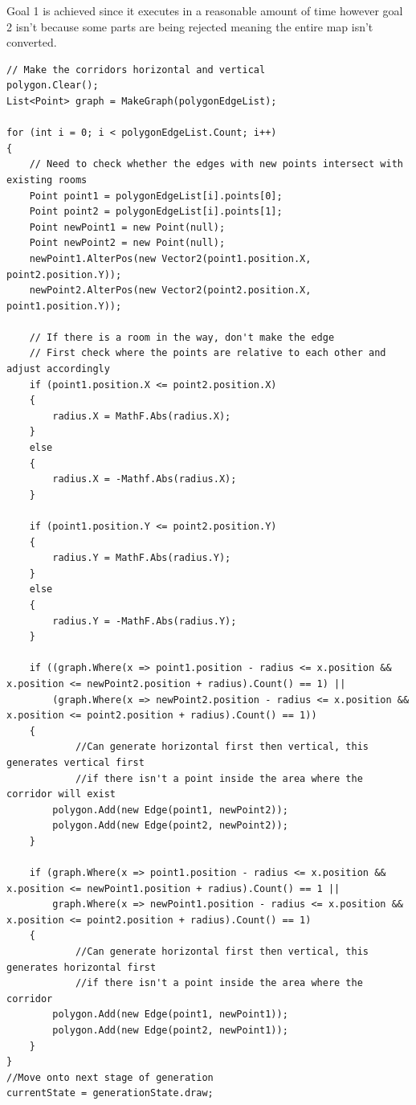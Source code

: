 \documentclass{article}
\newcommand{\parBr}{\vspace{5mm}}%
\begin{document}
\parBr

Goal 1 is achieved since it executes in a reasonable amount of time however goal 2 isn't because some parts are being rejected meaning the entire map isn't converted.
\begin{lstlisting}
// Make the corridors horizontal and vertical
polygon.Clear();
List<Point> graph = MakeGraph(polygonEdgeList);

for (int i = 0; i < polygonEdgeList.Count; i++)
{
    // Need to check whether the edges with new points intersect with existing rooms
    Point point1 = polygonEdgeList[i].points[0];
    Point point2 = polygonEdgeList[i].points[1];
    Point newPoint1 = new Point(null);
    Point newPoint2 = new Point(null);
    newPoint1.AlterPos(new Vector2(point1.position.X, point2.position.Y));
    newPoint2.AlterPos(new Vector2(point2.position.X, point1.position.Y));

    // If there is a room in the way, don't make the edge
    // First check where the points are relative to each other and adjust accordingly
    if (point1.position.X <= point2.position.X)
    {
        radius.X = MathF.Abs(radius.X);
    }
    else
    {
        radius.X = -Mathf.Abs(radius.X);
    }
    
    if (point1.position.Y <= point2.position.Y)
    {
        radius.Y = MathF.Abs(radius.Y);
    }
    else
    {
        radius.Y = -MathF.Abs(radius.Y);
    }

    if ((graph.Where(x => point1.position - radius <= x.position && x.position <= newPoint2.position + radius).Count() == 1) ||
        (graph.Where(x => newPoint2.position - radius <= x.position && x.position <= point2.position + radius).Count() == 1))
    {
    		//Can generate horizontal first then vertical, this generates vertical first
    		//if there isn't a point inside the area where the corridor will exist
        polygon.Add(new Edge(point1, newPoint2));
        polygon.Add(new Edge(point2, newPoint2));
    }

    if (graph.Where(x => point1.position - radius <= x.position && x.position <= newPoint1.position + radius).Count() == 1 ||
        graph.Where(x => newPoint1.position - radius <= x.position && x.position <= point2.position + radius).Count() == 1)
    {
    		//Can generate horizontal first then vertical, this generates horizontal first
    		//if there isn't a point inside the area where the corridor
        polygon.Add(new Edge(point1, newPoint1));
        polygon.Add(new Edge(point2, newPoint1));
    }
}
//Move onto next stage of generation
currentState = generationState.draw;
\end{lstlisting}
\end{document}
